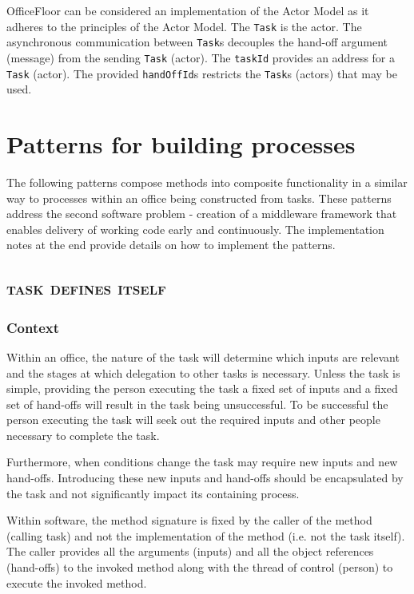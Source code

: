 \documentclass[prodmode]{style/acmlarge}
\begin{document}
OfficeFloor can be considered an implementation of the Actor Model \cite{actors}
as it adheres to the principles of the Actor Model.  The \texttt{Task} is the
actor.  The asynchronous communication between \texttt{Task}s decouples the
hand-off argument (message) from the sending \texttt{Task} (actor).  The
\texttt{taskId} provides an address for a \texttt{Task} (actor).  The provided
\texttt{handOffId}s restricts the \texttt{Task}s (actors) that may be used.




\section{Patterns for building processes}

The following patterns compose methods into composite functionality in a similar
way to processes within an office being constructed from tasks.  These patterns
address the second software problem - creation of a middleware framework that
enables delivery of working code early and continuously.  The implementation
notes at the end provide details on how to implement the patterns.


\subsection{\textsc{\textbf{task defines itself}}}

\subsubsection*{Context} Within an office, the nature of the task will determine
which inputs are relevant and the stages at which delegation to other tasks is
necessary.  Unless the task is simple, providing the person executing the task a
fixed set of inputs and a fixed set of hand-offs will result in the task being
unsuccessful.  To be successful the person executing the task will seek out the
required inputs and other people necessary to complete the task.

Furthermore, when conditions change the task may require new inputs and new
hand-offs.  Introducing these new inputs and hand-offs should be encapsulated by
the task and not significantly impact its containing process.

Within software, the method signature is fixed by the caller of the method
(calling task) and not the implementation of the method (i.e. not the task
itself).  The caller provides all the arguments (inputs) and all the
object references (hand-offs) to the invoked method along with the thread of
control (person) to execute the invoked method.
\end{document}
